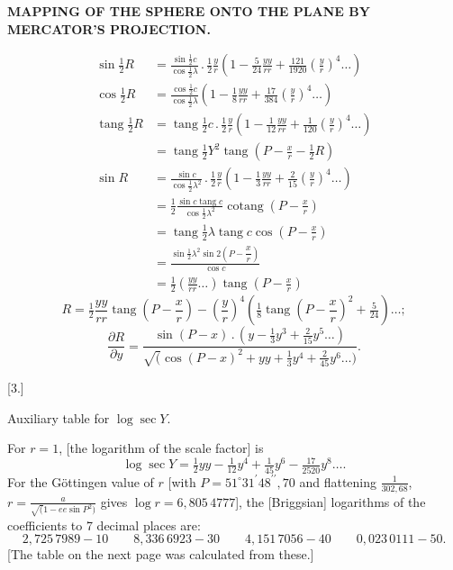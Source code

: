 \par\clearpage
\noindent\null\hfill{\fontsize{8}{10}\selectfont\textbf{MAPPING OF THE SPHERE ONTO THE PLANE BY MERCATOR'S PROJECTION.}}\hfill{}\par\medskip

\noindent [we obtain]
\[
\begin{aligned}
\sin\tfrac12R
 &=\frac{\sin\tfrac12 c}{\cos\tfrac12\lambda}\,.\,\tfrac12\frac yr
 \left(1-\tfrac5{24}\frac{yy}{rr}+\tfrac{121}{1920}\left(\frac yr\right)^4\ldots\right)\\
\cos\tfrac12R
 &=\frac{\cos\tfrac12 c}{\cos\tfrac12\lambda}
 \left(1-\tfrac18\frac{yy}{rr}+\tfrac{17}{384}\left(\frac yr\right)^4\ldots\right)\\
\operatorname{tang}\tfrac12R
 &=\operatorname{tang}\tfrac12c\,.\,\tfrac12\frac yr
 \left(1-\tfrac1{12}\frac{yy}{rr}+\tfrac1{120}\left(\frac yr\right)^4\ldots\right)\\
 &=\operatorname{tang}\tfrac12Y^2\operatorname{tang}\left(P-\frac xr-\tfrac12R\right)\\
\sin R&=\frac{\sin c}{\cos\tfrac12\lambda^2}\,.\,\tfrac12\frac yr
 \left(1-\tfrac13\frac{yy}{rr}+\tfrac2{15}\left(\frac yr\right)^4\ldots\right)\\
 &=\tfrac12\frac{\sin c\operatorname{tang}c}{\cos\tfrac12\lambda^2}
 \operatorname{cotang}\left(P-\frac xr\right)\\
 &=\operatorname{tang}\tfrac12\lambda\operatorname{tang}c\cos\left(P-\frac xr\right)\\
 &=\frac{\sin\tfrac12\lambda^2\sin2\left(P-\dfrac xr\right)}{\cos c}\\
 &=\tfrac12\left(\frac{yy}{rr}\ldots\right)\operatorname{tang}\left(P-\frac xr\right)
\end{aligned}
\]
\[
R=\tfrac12\frac{yy}{rr}\operatorname{tang}\left(P-\frac xr\right)
 -\left(\frac yr\right)^4\left(\tfrac18\operatorname{tang}\left(P-\frac xr\right)^2+\tfrac5{24}\right)\ldots;
\]
\noindent [for \(r=1\), we have]
\[
\frac{\partial R}{\partial y}=
\frac{\sin(P-x)\,.\,(y-\tfrac13y^3+\tfrac2{15}y^5\ldots)}
{\surd(\cos(P-x)^2+yy+\tfrac13y^4+\tfrac2{45}y^6\ldots)}.
\]

\begin{center}
[3.]\par\medskip
Auxiliary table for \(\log\sec Y\).
\end{center}
For \(r=1\), [the logarithm of the scale factor] is
\[
\log\sec Y=\tfrac12 yy-\tfrac1{12}y^4+\tfrac1{45}y^6-\tfrac{17}{2520}y^8\ldots.
\]
For the Göttingen value of \(r\) [with \(P=51^\circ31^{\prime}48^{\prime\prime}{,}70\)
and flattening \(\frac1{302{,}68}\), \(r=\frac a{\surd(1-ee\sin P^2)}\) gives
\(\log r=6{,}805\,4777\)], the [Briggsian] logarithms of the coefficients
to 7 decimal places are:
\[
2{,}725\,7989-10\qquad 8{,}336\,6923-30\qquad
4{,}151\,7056-40\qquad 0{,}023\,0111-50.
\]
[The table on the next page was calculated from these.]

